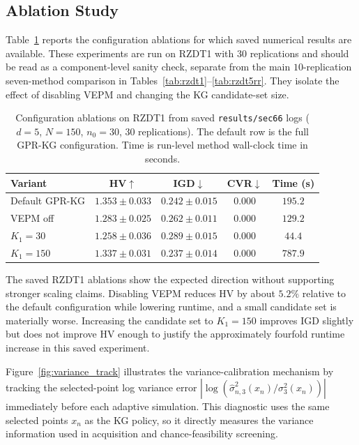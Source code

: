 \documentclass[12pt]{article}
\theoremstyle{plain}
\theoremstyle{definition}
\theoremstyle{remark}
\begin{document}
\subsection{Ablation Study}\label{subsec:exp_ablation}

Table~\ref{tab:ablation} reports the configuration ablations for which
saved numerical results are available.  These experiments are run on
RZDT1 with $30$ replications and should be read as a component-level
sanity check, separate from the main $10$-replication seven-method
comparison in Tables~\ref{tab:rzdt1}--\ref{tab:rzdt5rr}.  They isolate
the effect of disabling VEPM and changing the KG candidate-set size.

\begin{table}[t]
\centering
\caption{Configuration ablations on RZDT1 from saved
\texttt{results/sec66} logs ($d=5$, $N=150$, $n_0=30$, 30 replications).
The default row is the full GPR-KG configuration.  Time is run-level
method wall-clock time in seconds.}
\label{tab:ablation}
\small
\begin{tabular}{l c c c c}
\toprule
Variant & HV$\uparrow$ & IGD$\downarrow$ & CVR$\downarrow$ & Time (s) \\
\midrule
Default GPR-KG & $1.353 \pm 0.033$ & $0.242 \pm 0.015$ & $0.000$ & $195.2$ \\
VEPM off       & $1.283 \pm 0.025$ & $0.262 \pm 0.011$ & $0.000$ & $129.2$ \\
$K_1=30$       & $1.258 \pm 0.036$ & $0.289 \pm 0.015$ & $0.000$ & $44.4$ \\
$K_1=150$      & $1.337 \pm 0.031$ & $0.237 \pm 0.014$ & $0.000$ & $787.9$ \\
\bottomrule
\end{tabular}
\end{table}

The saved RZDT1 ablations show the expected direction without supporting
stronger scaling claims.  Disabling VEPM reduces HV by about $5.2\%$
relative to the default configuration while lowering runtime, and a small
candidate set is materially worse.  Increasing the candidate set to
$K_1=150$ improves IGD slightly but does not improve HV enough to justify
the approximately fourfold runtime increase in this saved experiment.

Figure~\ref{fig:variance_track} illustrates the variance-calibration
mechanism by tracking the selected-point log variance error
$|\log(\hat{\sigma}_{n,3}^{2}(x_n)/\sigma_3^{2}(x_n))|$ immediately
before each adaptive simulation.  This diagnostic uses the same selected
points $x_n$ as the KG policy, so it directly measures the variance
information used in acquisition and chance-feasibility screening.
\end{document}

